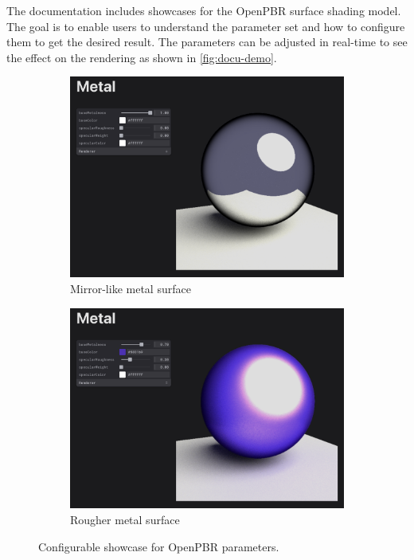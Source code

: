 The documentation includes showcases for the \gls{OpenPBR} surface shading model. The goal is to enable users to understand the parameter set and how to configure them to get the desired result. The parameters can be adjusted in real-time to see the effect on the rendering as shown in \autoref{fig:docu-demo}.

\begin{figure}[H]
    \centering
    \begin{subfigure}[b]{0.45\textwidth}
        \includegraphics[width=\textwidth]{resources/docu-demo-mirror-metal.png}
        \caption{Mirror-like metal surface}
        \label{fig:docu-demo-mirror}
    \end{subfigure}
    \hfill
    \begin{subfigure}[b]{0.45\textwidth}
        \includegraphics[width=\textwidth]{resources/docu-demo-rough-metal.png}
        \caption{Rougher metal surface}
        \label{fig:docu-demo-rough}
    \end{subfigure}
    \caption{Configurable showcase for \gls{OpenPBR} parameters.}
    \label{fig:docu-demo}
\end{figure}

